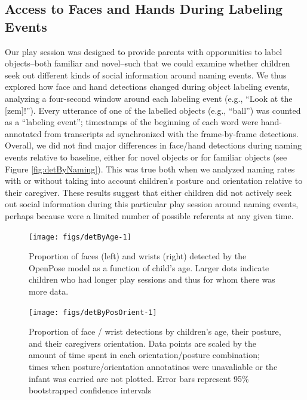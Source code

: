 \documentclass[english,man,floatsintext,draftall]{apa6}
\begin{document}
\subsection{Access to Faces and Hands During Labeling
Events}\label{access-to-faces-and-hands-during-labeling-events}

Our play session was designed to provide parents with opporunities to
label objects--both familiar and novel--such that we could examine
whether children seek out different kinds of social information around
naming events. We thus explored how face and hand detections changed
during object labeling events, analyzing a four-second window around
each labeling event (e.g., \enquote{Look at the {[}zem{]}!}). Every
utterance of one of the labelled objects (e.g., \enquote{ball}) was
counted as a \enquote{labeling event}; timestamps of the beginning of
each word were hand-annotated from transcripts ad synchronized with the
frame-by-frame detections. Overall, we did not find major differences in
face/hand detections during naming events relative to baseline, either
for novel objects or for familiar objects (see Figure
\ref{fig:detByNaming}). This was true both when we analyzed naming rates
with or without taking into account children's posture and orientation
relative to their caregiver. These results suggest that either children
did not actively seek out social information during this particular play
session around naming events, perhaps because were a limited number of
possible referents at any given time.

\begin{figure}[h]

{\centering \texttt{[image: figs/detByAge-1]} 

}

\caption{Proportion of faces (left) and wrists (right) detected by the OpenPose model as a function of child's age. Larger dots indicate children who had longer play sessions and thus for whom there was more data.}\label{fig:detByAge}
\end{figure}

\begin{figure}[h]

{\centering \texttt{[image: figs/detByPosOrient-1]} 

}

\caption{Proportion of face / wrist detections by children's age, their posture, and their caregivers orientation. Data points are scaled by the amount of time spent in each orientation/posture combination; times when posture/orientation annotatinos were unavaliable or the infant was carried are not plotted. Error bars represent 95\% bootstrapped confidence intervals}\label{fig:detByPosOrient}
\end{figure}
\end{document}

